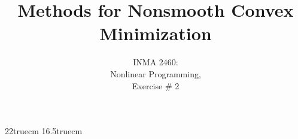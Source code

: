 
\textheight22truecm
\textwidth16.5truecm
\setlength{\oddsidemargin}{0cm}
\setlength{\evensidemargin}{0cm}
\setlength{\topmargin}{0cm}


\def\epi{{\rm epi \,}}
\def\nr{\par \noindent}
\def\diag{{\rm diag \,}}
\def\inter{{\rm int \,}}
\def\trace{{\rm Trace \,}}
\def\lin{{\rm Lin \,}}
\def\conv{{\rm Conv \,}}
\def\beq{\begin{equation}}
\def\eeq{\end{equation}}
\newcommand{\rint}{{\rm rint\,}}
\newcommand{\N}{\parallel}
\newcommand{\A}{\mid}

\newtheorem{theorem}{Theorem}[section]
\newtheorem{lemma}{Lemma}[section]
\newtheorem{corollary}{Corollary}[section]
\newtheorem{condition}{Condition}[section]
\newtheorem{conjecture}{Conjecture}[section]
\newtheorem{proposition}{Proposition}[section]
\newtheorem{assumption}{Assumption}[section]
\newtheorem{definition}{Definition}[section]
\newtheorem{property}{Property}[section]
\newtheorem{remark}{Remark}[section]
\newcommand{\proof}{\bf Proof: \rm \nr}
\newcommand{\qed}{\hfill $\Box$ \nr \medskip}
\newcommand{\half}{\mbox{${1 \over 2}$}}
\renewcommand\arraystretch{1}
\def\ba{\begin{array}}
\def\ea{\end{array}}
\def\beann{\begin{eqnarray*}}
\def\eeann{\end{eqnarray*}}
\def\bea{\begin{eqnarray}}
\def\eea{\end{eqnarray}}

\def\BT{\begin{theorem}}
\def\ET{\end{theorem}}
\def\BL{\begin{lemma}}
\def\EL{\end{lemma}}
\def\BC{\begin{corollary}}
\def\EC{\end{corollary}}
\def\BA{\begin{assumption}}
\def\EA{\end{assumption}}


\def\la{\langle}
\def\ra{\rangle}

\def\theequation{\thesection.\arabic{equation}}


\title{Methods for Nonsmooth Convex Minimization}
\author{INMA 2460: \\
Nonlinear Programming,\\
Exercise $\#$ 2}

